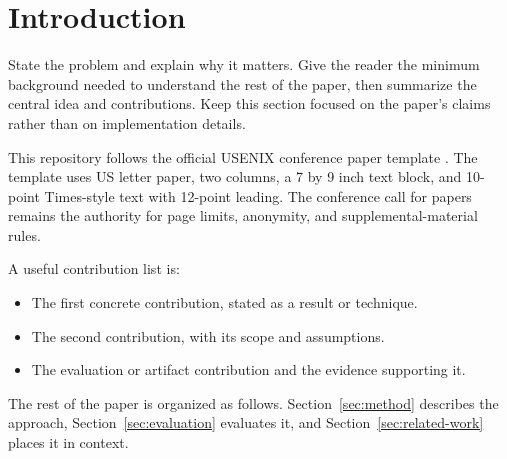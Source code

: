 \section{Introduction}
\label{sec:introduction}

State the problem and explain why it matters. Give the reader the minimum
background needed to understand the rest of the paper, then summarize the
central idea and contributions. Keep this section focused on the paper's
claims rather than on implementation details.

This repository follows the official USENIX conference paper template
\cite{usenix-paper-templates}. The template uses US letter paper, two columns,
a 7 by 9 inch text block, and 10-point Times-style text with 12-point leading.
The conference call for papers remains the authority for page limits,
anonymity, and supplemental-material rules.

A useful contribution list is:
\begin{itemize}
  \item The first concrete contribution, stated as a result or technique.
  \item The second contribution, with its scope and assumptions.
  \item The evaluation or artifact contribution and the evidence supporting it.
\end{itemize}

The rest of the paper is organized as follows. Section~\ref{sec:method}
describes the approach, Section~\ref{sec:evaluation} evaluates it, and
Section~\ref{sec:related-work} places it in context.
